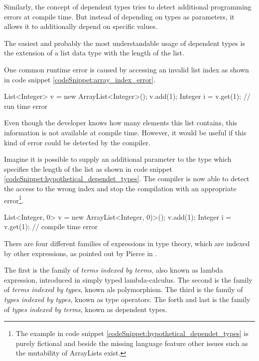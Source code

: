 Similarly, the concept of dependent types tries to detect additional programming errors at compile time.
But instead of depending on types as parameters, it allows it to additionally depend on specific values. 

The easiest and probably the most understandable usage of dependent types is the extension of a list data type with the length of the list. 

One common runtime error is caused by accessing an invalid list index as shown in code snippet \ref{codeSnippet:array_index_error}.

\begin{codesnippet}[caption={ArrayList index error}, label={codeSnippet:array_index_error}]
List<Integer> v = new ArrayList<Integer>();
v.add(1);
Integer i = v.get(1); // run time error
\end{codesnippet}

Even though the developer knows how many elements this list contains, this information is not available at compile time. 
However, it would be useful if this kind of error could be detected by the compiler.

Imagine it is possible to supply an additional parameter to the type which specifies the length of the list as shown in code snippet \ref{codeSnippet:hypothetical_dependet_types}. 
The compiler is now able to detect the access to the wrong index and stop the compilation with an appropriate error\footnote{The example in code snippet \ref{codeSnippet:hypothetical_dependet_types} is purely fictional and beside the missing language feature other issues such as the mutability of ArrayLists exist.}.
\begin{adjustbox}{width=\columnwidth}
\begin{codesnippet}[escapeinside={(*}{*)}, caption={ArrayList with size parameter}, label={codeSnippet:hypothetical_dependet_types}]
List<Integer, 0> v = new ArrayList<Integer, 0)>();
v.add(1);
Integer i = v.get(1); // compile time error
\end{codesnippet}
\end{adjustbox}
\linebreak

There are four different families of expressions in type theory, which are indexed by other expressions, as pointed out by Pierce in \cite{10.5555/1076265}. 

The first is the family of \emph{terms indexed by terms}, also known as lambda expression, introduced in simply typed lambda-calculus. 
The second is the family of \emph{terms indexed by types}, known als polymorphism. 
The third is the family of \emph{types indexed by types}, known as type operators.
The forth and last is the family of \emph{types indexed by terms}, known as dependent types.

